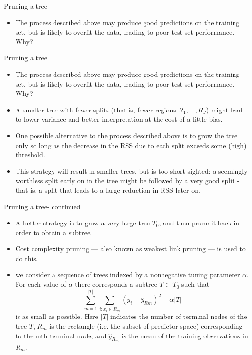 \documentclass[aspectratio=169, 11pt]{beamer}
\begin{document}
\begin{frame}{Pruning a tree}
\begin{itemize}
    \item The process described above may produce good predictions on the training set, but is likely to overfit the data, leading to poor test set performance. Why?
\end{itemize}
\end{frame}

\begin{frame}{Pruning a tree}
\begin{itemize}
    \item The process described above may produce good predictions on the training set, but is likely to overfit the data, leading to poor test set performance. Why?
    \item A smaller tree with fewer splits (that is, fewer regions $R_{1},...,R_{J}$) might lead to lower variance and better interpretation at the cost of a little bias.
    \item One possible alternative to the process described above is to grow the tree only so long as the decrease in the RSS due to each split exceeds some (high) threshold.
    \item This strategy will result in smaller trees, but is too short-sighted: a seemingly worthless split early on in the tree might be followed by a very good split - that is, a split that leads to a large reduction in RSS later on.
\end{itemize}
\end{frame}

\begin{frame}{Pruning a tree- continued}
\begin{itemize}
    \item A better strategy is to grow a very large tree $T_{0}$, and then prune it back in order to obtain a subtree.
    \item Cost complexity pruning --- also known as weakest link pruning --- is used to do this.
    \item we consider a sequence of trees indexed by a nonnegative tuning parameter $\alpha$. For each value of $\alpha$ there corresponds a subtree $T\subset T_{0}$ such that
    \begin{equation*}
    \sum_{m=1}^{|T|}\sum_{i:x_{i}\in R_{m}}(y_{i}-\hat{y}_{Rm})^{2}+\alpha|T|
    \end{equation*}
    is as small as possible. Here $|T|$ indicates the number of terminal nodes of the tree $T$, $R_{m}$ is the rectangle (i.e. the subset of predictor space) corresponding to the mth terminal node, and $\hat{y}_{R_{m}}$ is the mean of the training observations in $R_{m}$.
\end{itemize}
\end{frame}
\end{document}
